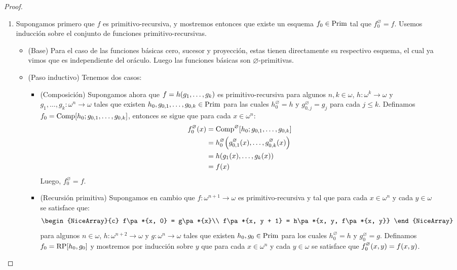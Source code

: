 \begin{proof}
	\begin{enumerate}
		\item Supongamos primero que $f$ es primitivo-recursiva, y mostremos entonces que existe un esquema $f_{0}\in\mathrm{Prim}$ tal que $f_{0}^{\varnothing} = f$. Usemos inducción sobre el conjunto de funciones primitivo-recursivas.

		\begin{itemize}
			\item (Base) Para el caso de las funciones básicas cero, sucesor y proyección, estas tienen directamente su respectivo esquema, el cual ya vimos que es independiente del oráculo. Luego las funciones básicas son $\varnothing$-primitivas.

			\item (Paso inductivo) Tenemos dos casos:

			\begin{itemize}
				\item (Composición) Supongamos ahora que $f = h\pa*{g_{1},\dotsc, g_{k}}$ es primitivo-recursiva para algunos $n, k\in\omega$, $h:\omega^{k}\to\omega$ y $g_{1},\dotsc, g_{k}:\omega^{n}\to\omega$ tales que existen $h_{0}, g_{0, 1},\dotsc, g_{0, k}\in\mathrm{Prim}$ para las cuales $h_{0}^{\varnothing} = h$ y $g_{0, j}^{\varnothing} = g_{j}$ para cada $j\leq k$. Definamos $f_{0} =\COMPOSICION\bra*{h_{0}; g_{0, 1},\dotsc, g_{0, k}}$, entonces se sigue que para cada $x\in\omega^{n}$:
				\begin{align*}
					f_{0}^{\varnothing}\pa*{x} &=\COMPOSICION^{\varnothing}\bra*{h_{0}; g_{0, 1},\dotsc, g_{0, k}}\\
					&= h_{0}^{\varnothing}\pa*{g_{0, 1}^{\varnothing}\pa*{x},\dotsc, g_{0, k}^{\varnothing}\pa*{x}}\\
					&= h\pa*{g_{1}\pa*{x},\dotsc, g_{k}\pa*{x}}\\
					&= f\pa*{x}
				\end{align*}
				Luego, $f_{0}^{\varnothing} = f$.

				\item (Recursión primitiva) Supongamos en cambio que $f:\omega^{n + 1}\to\omega$ es primitivo-recursiva y tal que para cada $x\in\omega^{n}$ y cada $y\in\omega$ se satisface que:
				\[
					\begin{NiceArray}{c}
						f\pa*{x, 0} = g\pa*{x}\\
						f\pa*{x, y + 1} = h\pa*{x, y, f\pa*{x, y}}
					\end{NiceArray}
				\]
				para algunos $n\in\omega$, $h:\omega^{n + 2}\to\omega$ y $g:\omega^{n}\to\omega$ tales que existen $h_{0}, g_{0}\in\mathrm{Prim}$ para los cuales $h_{0}^{\varnothing} = h$ y $g_{0}^{\varnothing} = g$. Definamos $f_{0} =\RECURSION\bra*{h_{0}, g_{0}}$ y mostremos por inducción sobre $y$ que para cada $x\in\omega^{n}$ y cada $y\in\omega$ se satisface que $f_{0}^{\varnothing}\pa*{x, y} = f\pa*{x, y}$.


\end{itemize}
\end{itemize}
\end{enumerate}
\end{proof}
